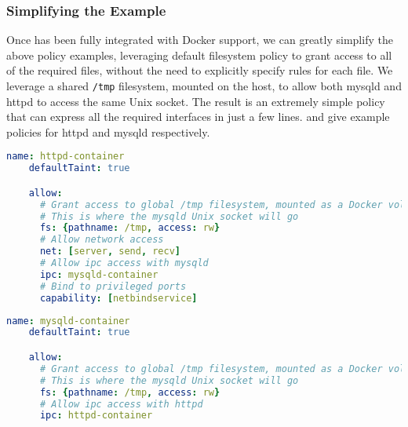 \subsubsection{Simplifying the \bpfcontain{} Example}

Once \bpfcontain{} has been fully integrated with Docker support, we can greatly simplify
the above policy examples, leveraging default filesystem policy to grant access to all of
the required files, without the need to explicitly specify rules for each file. We
leverage a shared \texttt{/tmp} filesystem, mounted on the host, to allow both mysqld and
httpd to access the same Unix socket. The result is an extremely simple policy that can
express all the required interfaces in just a few lines. 
and  give example policies for httpd and mysqld
respectively.

\begin{lstlisting}[language=yaml, gobble=4, float=false, caption={[A simplified \bpfcontain{} policy for Apache httpd]
  A simplified \bpfcontain{} policy for Apache httpd running in a Docker container,
  leveraging future support for automatic filesystem policy.
  %\todo{Describe this}
}, label={lst:bpfcontain-httpd-next}]
    name: httpd-container
    defaultTaint: true

    allow:
      # Grant access to global /tmp filesystem, mounted as a Docker volume
      # This is where the mysqld Unix socket will go
      fs: {pathname: /tmp, access: rw}
      # Allow network access
      net: [server, send, recv]
      # Allow ipc access with mysqld
      ipc: mysqld-container
      # Bind to privileged ports
      capability: [netbindservice]
\end{lstlisting}

\begin{lstlisting}[language=yaml, gobble=4, float=false, caption={[A simplified \bpfcontain{} policy for MySQL]
  A simplified \bpfcontain{} policy for MySQL running in a Docker container, leveraging
  future support for automatic filesystem policy.
  %\todo{Describe this}
}, label={lst:bpfcontain-mysqld-next}]
    name: mysqld-container
    defaultTaint: true

    allow:
      # Grant access to global /tmp filesystem, mounted as a Docker volume
      # This is where the mysqld Unix socket will go
      fs: {pathname: /tmp, access: rw}
      # Allow ipc access with httpd
      ipc: httpd-container
\end{lstlisting}

